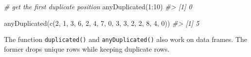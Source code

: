 \documentclass[
]{book}
\newenvironment{Shaded}{\begin{snugshade}}{\end{snugshade}}
\newcommand{\CommentTok}[1]{\textcolor[rgb]{0.56,0.35,0.01}{\textit{#1}}}
\newcommand{\DecValTok}[1]{\textcolor[rgb]{0.00,0.00,0.81}{#1}}
\newcommand{\FunctionTok}[1]{\textcolor[rgb]{0.00,0.00,0.00}{#1}}
\newcommand{\NormalTok}[1]{#1}
\newcommand{\SpecialCharTok}[1]{\textcolor[rgb]{0.00,0.00,0.00}{#1}}
\begin{document}
\begin{Shaded}
\begin{Highlighting}[]
\CommentTok{\# get the first duplicate position}
\FunctionTok{anyDuplicated}\NormalTok{(}\DecValTok{1}\SpecialCharTok{:}\DecValTok{10}\NormalTok{)}
\CommentTok{\#\textgreater{} [1] 0}

\FunctionTok{anyDuplicated}\NormalTok{(}\FunctionTok{c}\NormalTok{(}\DecValTok{2}\NormalTok{, }\DecValTok{1}\NormalTok{, }\DecValTok{3}\NormalTok{, }\DecValTok{6}\NormalTok{, }\DecValTok{2}\NormalTok{, }\DecValTok{4}\NormalTok{, }\DecValTok{7}\NormalTok{, }\DecValTok{0}\NormalTok{, }\DecValTok{3}\NormalTok{, }\DecValTok{3}\NormalTok{, }\DecValTok{2}\NormalTok{, }\DecValTok{2}\NormalTok{, }\DecValTok{8}\NormalTok{, }\DecValTok{4}\NormalTok{, }\DecValTok{0}\NormalTok{))}
\CommentTok{\#\textgreater{} [1] 5}
\end{Highlighting}
\end{Shaded}

The function \texttt{duplicated()} and \texttt{anyDuplicated()} also work on data frames. The former drops unique rows while keeping duplicate rows.
\end{document}
